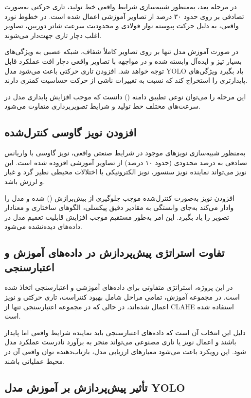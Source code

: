 \documentclass[a4paper, 10pt, twocolumn]{article}
\begin{document}
	در مرحله بعد، به‌منظور شبیه‌سازی شرایط واقعی خط تولید، تاری حرکتی به‌صورت تصادفی بر روی حدود ۳۰ درصد از تصاویر آموزشی اعمال شده است. در خطوط نورد واقعی، به دلیل حرکت پیوسته نوار فولادی و محدودیت سرعت شاتر دوربین، تصاویر اغلب دچار تاری جهت‌دار می‌شوند.
	
	در صورت آموزش مدل تنها بر روی تصاویر کاملاً شفاف، شبکه عصبی به ویژگی‌های بسیار تیز و ایده‌آل وابسته شده و در مواجهه با تصاویر واقعی دچار افت عملکرد قابل توجه خواهد شد. افزودن تاری حرکتی باعث می‌شود مدل YOLO یاد بگیرد ویژگی‌های پایدارتری را استخراج کند که نسبت به تغییرات ناشی از حرکت حساسیت کمتری دارند.
	
	این مرحله را می‌توان نوعی تطبیق دامنه () دانست که موجب افزایش پایداری مدل در سرعت‌های مختلف خط تولید و شرایط تصویربرداری متفاوت می‌شود.
	
	\subsection{افزودن نویز گاوسی کنترل‌شده}
	
	به‌منظور شبیه‌سازی نویزهای موجود در شرایط صنعتی واقعی، نویز گاوسی با واریانس تصادفی به درصد محدودی (حدود ۱۰ درصد) از تصاویر آموزشی افزوده شده است. این نویز می‌تواند نماینده نویز سنسور، نویز الکترونیکی یا اختلالات محیطی نظیر گرد و غبار و لرزش باشد.
	
	افزودن نویز به‌صورت کنترل‌شده موجب جلوگیری از بیش‌برازش () شده و مدل را وادار می‌کند به‌جای وابستگی به مقادیر دقیق پیکسلی، الگوهای ساختاری و معنادار تصویر را یاد بگیرد. این امر به‌طور مستقیم موجب افزایش قابلیت تعمیم مدل در داده‌های دیده‌نشده می‌شود.
	
	\subsection{تفاوت استراتژی پیش‌پردازش در داده‌های آموزش و اعتبارسنجی}
	
	در این پروژه، استراتژی متفاوتی برای داده‌های آموزشی و اعتبارسنجی اتخاذ شده است. در مجموعه آموزش، تمامی مراحل شامل بهبود کنتراست، تاری حرکتی و نویز اعمال شده‌اند، در حالی که در مجموعه اعتبارسنجی تنها از CLAHE استفاده شده است.
	
	دلیل این انتخاب آن است که داده‌های اعتبارسنجی باید نماینده شرایط واقعی اما پایدار باشند و اعمال نویز یا تاری مصنوعی می‌تواند منجر به برآورد نادرست عملکرد مدل شود. این رویکرد باعث می‌شود معیارهای ارزیابی مدل، بازتاب‌دهنده توان واقعی آن در محیط عملیاتی باشند.
	
	\subsection{تأثیر پیش‌پردازش بر آموزش مدل YOLO}
	
\end{document}
